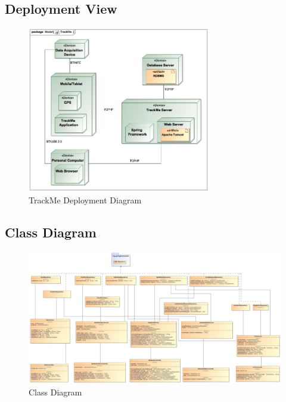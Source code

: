\documentclass[a4paper]{article}
\begin{document}
\subsection{Deployment View}
\begin{figure}[!htpb]
    \centering
    \includegraphics[width=80mm,keepaspectratio]{images/UML/deployment_TrackMe.jpg}
    \caption{TrackMe Deployment Diagram}
    \label{fig:deployment_trackme}
\end{figure}    

\subsection{Class Diagram}
\begin{figure}[!htpb]
    \centering
    \advance\leftskip-3.3cm
    \includegraphics[width=1.6\textwidth,keepaspectratio]{DD/images/UML/ClassDiagram.jpg}
    \caption{Class Diagram}
    \label{fig:class_diagram}
\end{figure} 
\end{document}
